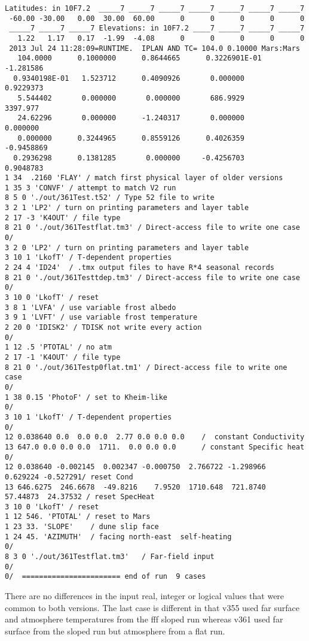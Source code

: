 \documentclass{article}
\begin{document}
\begin{verbatim}
Latitudes: in 10F7.2  _____7 _____7 _____7 _____7 _____7 _____7 _____7
 -60.00 -30.00   0.00  30.00  60.00      0      0      0      0      0
 _____7 _____7 _____7 Elevations: in 10F7.2 ____7 _____7 _____7 _____7
   1.22   1.17   0.17  -1.99  -4.08      0      0      0      0      0
 2013 Jul 24 11:28:09=RUNTIME.  IPLAN AND TC= 104.0 0.10000 Mars:Mars
   104.0000      0.1000000      0.8644665      0.3226901E-01  -1.281586    
  0.9340198E-01   1.523712      0.4090926       0.000000      0.9229373    
   5.544402       0.000000       0.000000       686.9929       3397.977    
   24.62296       0.000000      -1.240317       0.000000       0.000000    
   0.000000      0.3244965      0.8559126      0.4026359     -0.9458869    
  0.2936298      0.1381285       0.000000     -0.4256703      0.9048783 
1 34  .2160 'FLAY' / match first physical layer of older versions
1 35 3 'CONVF' / attempt to match V2 run
8 5 0 './out/361Test.t52' / Type 52 file to write
3 2 1 'LP2' / turn on printing parameters and layer table
2 17 -3 'K4OUT' / file type
8 21 0 './out/361Testflat.tm3' / Direct-access file to write one case
0/ 
3 2 0 'LP2' / turn on printing parameters and layer table 
3 10 1 'LkofT' / T-dependent properties 
2 24 4 'ID24'  / .tmx output files to have R*4 seasonal records
8 21 0 './out/361Testtdep.tm3' / Direct-access file to write one case
0/  
3 10 0 'LkofT' / reset
3 8 1 'LVFA' / use variable frost albedo 
3 9 1 'LVFT' / use variable frost temperature 
2 20 0 'IDISK2' / TDISK not write every action
0/ 
1 12 .5 'PTOTAL' / no atm
2 17 -1 'K4OUT' / file type
8 21 0 './out/361Testp0flat.tm1' / Direct-access file to write one case
0/
1 38 0.15 'PhotoF' / set to Kheim-like 
0/ 
3 10 1 'LkofT' / T-dependent properties
0/  
12 0.038640 0.0  0.0 0.0  2.77 0.0 0.0 0.0    /  constant Conductivity
13 647.0 0.0 0.0 0.0  1711.  0.0 0.0 0.0      / constant Specific heat
0/ 
12 0.038640 -0.002145  0.002347 -0.000750  2.766722 -1.298966  0.629224 -0.527291/ reset Cond
13 646.6275  246.6678  -49.8216    7.9520  1710.648  721.8740  57.44873  24.37532 / reset SpecHeat
3 10 0 'LkofT' / reset
1 12 546. 'PTOTAL' / reset to Mars
1 23 33. 'SLOPE'    / dune slip face
1 24 45. 'AZIMUTH'  / facing north-east  self-heating
0/
8 3 0 './out/361Testflat.tm3'   / Far-field input
0/
0/  ======================= end of run  9 cases
\end{verbatim} 

There are no differences in the input real, integer or logical values that were
common to both versions. The last case is different in that v355 used far
surface and atmosphere temperatures from the fff sloped run whereas v361 used
far surface from the sloped run but atmosphere from a flat run.
\end{document}
